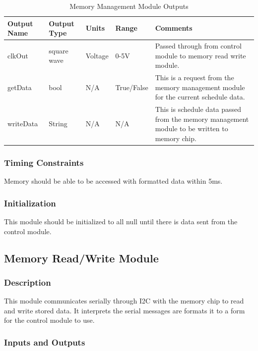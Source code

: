 \documentclass[12pt,titlepage]{article}
\begin{document}
\begin{table}[ht!]
\begin{center}
\begin{adjustbox}{max width=\textwidth}
\small
\begin{tabular}{|p{}|p{}|p{}|p{}|p{}|}
 \hline
 \textbf{Output Name} & \textbf{Output Type} & \textbf{Units} &\textbf{Range} & \textbf{Comments} \\
 \hline 
   clkOut & square wave  & Voltage & 0-5V & Passed through from control module to memory read write module. \\
 \hline
 getData & bool & N/A & True/False & This is a request from the memory management module for the current schedule data.  \\
 \hline
  writeData & String  & N/A & N/A & This is schedule data passed from the memory management module to be written to memory chip.  \\
 \hline
\end{tabular}
\end{adjustbox}
\end{center}
\caption{Memory Management Module Outputs}
\end{table}

\subsubsection*{Timing Constraints}
Memory should be able to be accessed with formatted data within 5ms.
\subsubsection*{Initialization}
This module should be initialized to all null until there is data sent from the control module.

\subsection{Memory Read/Write Module }
\subsubsection*{Description}
This module communicates serially through I2C with the memory chip to read and write stored data. It interprets the serial messages are formats it to a form for the control module to use. 
\subsubsection*{Inputs and Outputs}
\end{document}
